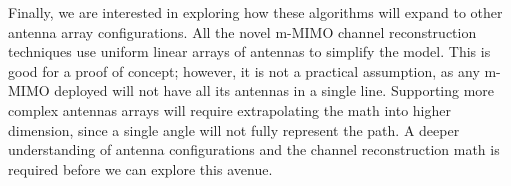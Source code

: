 Finally, we are interested in exploring how these algorithms will expand to other antenna array configurations. All the novel m-MIMO channel reconstruction techniques use uniform linear arrays of antennas to simplify the model. This is good for a proof of concept; however, it is not a practical assumption, as any m-MIMO deployed will not have all its antennas in a single line. Supporting more complex antennas arrays will require extrapolating the math into higher dimension, since a single angle will not fully represent the path. A deeper understanding of antenna configurations and the channel reconstruction math is required before we can explore this avenue.